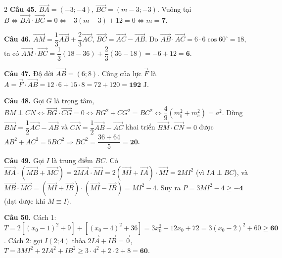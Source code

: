 \documentclass[12pt,a4paper]{article}
\begin{document}
\begin{multicols}{2}
\textbf{Câu 45.} $\vec{BA} = (-3; -4)$, $\vec{BC} = (m - 3; -3)$. Vuông tại $B \Leftrightarrow \vec{BA}\cdot\vec{BC} = 0 \Leftrightarrow -3(m - 3) + 12 = 0 \Leftrightarrow m = \mathbf{7}$.\par\vspace{3pt}

\textbf{Câu 46.} $\vec{AM} = \dfrac{1}{3}\vec{AB} + \dfrac{2}{3}\vec{AC}$, $\vec{BC} = \vec{AC} - \vec{AB}$. Do $\vec{AB}\cdot\vec{AC} = 6\cdot 6\cos 60^\circ = 18$, ta có $\vec{AM}\cdot\vec{BC} = \dfrac{1}{3}(18 - 36) + \dfrac{2}{3}(36 - 18) = -6 + 12 = \mathbf{6}$.\par\vspace{3pt}

\textbf{Câu 47.} Độ dời $\vec{AB} = (6; 8)$. Công của lực $\vec{F}$ là $A = \vec{F}\cdot\vec{AB} = 12\cdot 6 + 15\cdot 8 = 72 + 120 = \mathbf{192}\text{ J}$.\par\vspace{3pt}

\textbf{Câu 48.} Gọi $G$ là trọng tâm, $BM \perp CN \Leftrightarrow \vec{BG}\cdot\vec{CG} = 0 \Leftrightarrow BG^2 + CG^2 = BC^2 \Leftrightarrow \dfrac{4}{9}(m_b^2 + m_c^2) = a^2$. Dùng $\vec{BM} = \dfrac{1}{2}\vec{AC} - \vec{AB}$ và $\vec{CN} = \dfrac{1}{2}\vec{AB} - \vec{AC}$ khai triển $\vec{BM}\cdot\vec{CN} = 0$ được $AB^2 + AC^2 = 5BC^2 \Rightarrow BC^2 = \dfrac{36 + 64}{5} = \mathbf{20}$.\par\vspace{3pt}

\textbf{Câu 49.} Gọi $I$ là trung điểm $BC$. Có $\vec{MA}\cdot(\vec{MB} + \vec{MC}) = 2\vec{MA}\cdot\vec{MI} = 2(\vec{MI} + \vec{IA})\cdot\vec{MI} = 2MI^2$ (vì $IA \perp BC$), và $\vec{MB}\cdot\vec{MC} = (\vec{MI} + \vec{IB})\cdot(\vec{MI} - \vec{IB}) = MI^2 - 4$. Suy ra $P = 3MI^2 - 4 \ge \mathbf{-4}$ (đạt được khi $M \equiv I$).\par\vspace{3pt}

\textbf{Câu 50.} Cách 1: $T = 2[(x_0-1)^2 + 9] + [(x_0-4)^2 + 36] = 3x_0^2 - 12x_0 + 72 = 3(x_0 - 2)^2 + 60 \ge \mathbf{60}$. Cách 2: gọi $I(2; 4)$ thỏa $2\vec{IA} + \vec{IB} = \vec{0}$, $T = 3MI^2 + 2IA^2 + IB^2 \ge 3\cdot 4^2 + 2\cdot 2 + 8 = \mathbf{60}$.\par\vspace{3pt}

\end{multicols}
\end{document}
